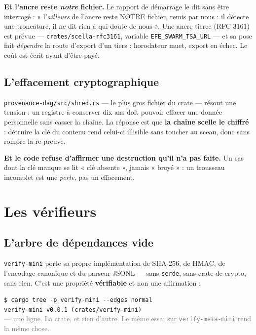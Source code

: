 \documentclass[10pt]{report}
\newcommand{\code}[1]{\texttt{\small #1}}
\newcommand{\att}[1]{\textcolor{amber}{\textbf{#1}}}
\begin{document}
\att{Et l'ancre reste \emph{notre} fichier.} Le rapport de démarrage le dit sans être interrogé :
« l'\emph{ailleurs} de l'ancre reste NOTRE fichier, remis par nous : il détecte une troncature, il
ne dit rien à qui doute de nous ». Une ancre tierce (RFC 3161) est prévue ---
\code{crates/scella-rfc3161}, variable \code{EFE\_SWARM\_TSA\_URL} --- et sa pose fait
\emph{dépendre} la route d'export d'un tiers : horodateur muet, export en échec. Le coût est écrit
avant d'être payé.

\subsection{L'effacement cryptographique}

\code{provenance-dag/src/shred.rs} --- le plus gros fichier du crate --- résout une tension : un
registre à conserver dix ans doit pouvoir effacer une donnée personnelle sans casser la chaîne. La
réponse est que \textbf{la chaîne scelle le chiffré} : détruire la clé du contenu rend celui-ci
illisible sans toucher au sceau, donc sans rompre la re-preuve.

\att{Et le code refuse d'affirmer une destruction qu'il n'a pas faite.} Un cas dont la clé manque
se lit « clé absente », jamais « broyé » : un trousseau incomplet est une \emph{perte}, pas un
effacement.

\section{Les vérifieurs}

\subsection{L'arbre de dépendances vide}

\code{verify-mini} porte sa propre implémentation de SHA-256, de HMAC, de l'encodage canonique et du
parseur JSONL --- sans \code{serde}, sans crate de crypto, sans rien. C'est une propriété
\textbf{vérifiable} et non une affirmation :

\begin{extrait}
\footnotesize
\code{\$ cargo tree -p verify-mini -{}-edges normal}\\
\code{verify-mini v0.0.1 (crates/verify-mini)}\\[2pt]
\textcolor{grey}{--- une ligne. La crate, et rien d'autre. Le même essai sur \code{verify-meta-mini}
rend la même chose.}
\end{extrait}
\end{document}
